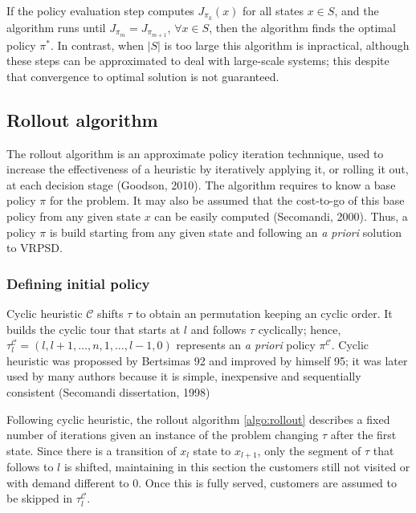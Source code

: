 If the policy evaluation step computes $J_{\pi_k}(x)$ for all states $x \in S$, and the algorithm runs until  $J_{\pi_m} = J_{\pi_{m+1}}$, $\forall x \in S$, then the algorithm finds the optimal policy $\pi^*$. In contrast, when $|S|$ is too large this algorithm is inpractical, although these steps can be approximated to deal with large-scale systems; this despite that convergence to optimal solution is not guaranteed.


\subsection{Rollout algorithm}

The rollout algorithm is an approximate policy iteration technnique, used to increase the effectiveness of a heuristic by iteratively applying it, or rolling it out, at each decision stage (Goodson, 2010). The algorithm requires to know a base policy $\pi$ for the problem. It may also be assumed that the cost-to-go of this base policy from any given state $x$ can be easily computed (Secomandi, 2000). Thus, a policy $\pi$ is build starting from any given state and following an \textit{a priori} solution to VRPSD.


\subsubsection{Defining initial policy}\label{sec:initial_policy}


Cyclic heuristic $\mathcal{C}$ shifts $\tau$ to obtain an permutation keeping an cyclic order. It builds the cyclic tour that starts at $l$ and follows $\tau$ cyclically; hence, $\tau^\mathcal{C}_l = (l, l+1, \ldots , n , 1 , \ldots , l-1, 0)$ represents an \textit{a priori} policy $\pi^\mathcal{C}$. Cyclic heuristic was propossed by Bertsimas 92  and improved by himself 95; it was later used by many authors because it is simple, inexpensive and sequentially consistent (Secomandi dissertation, 1998)

Following cyclic heuristic, the rollout algorithm \ref{algo:rollout} describes a fixed number of iterations given an instance of the problem changing $\tau$ after the first state. Since there is a transition of $x_l$ state to $x_{l+1}$, only the segment of $\tau$ that follows to $l$ is shifted, maintaining in this section the customers still not visited or with demand different to $0$. Once this is fully served, customers are assumed to be skipped in $\tau^\mathcal{C}_l$.

